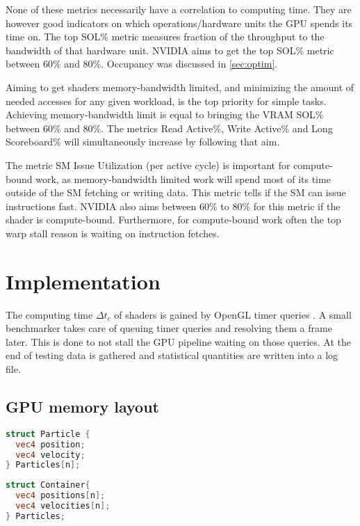 \documentclass[m,times]{cgMA}
\begin{document}
None of these metrics necessarily have a correlation to computing time. They are however good indicators on which operations/hardware units the GPU spends its time on. The top SOL\% metric measures fraction of the throughput to the bandwidth of that hardware unit. NVIDIA aims to get the top SOL\% metric between 60\% and 80\%. Occupancy was discussed in \ref{sec:optim}. \cite{NVIDIA:PEAK_PERFORMANCE}

Aiming to get shaders memory-bandwidth limited, and minimizing the amount of needed accesses for any given workload, is the top priority for simple tasks. Achieving memory-bandwidth limit is equal to bringing the VRAM SOL\% between 60\% and 80\%. The metrics Read Active\%, Write Active\% and Long Scoreboard\% will simultaneously increase by following that aim.

The metric SM Issue Utilization (per active cycle) is important for compute-bound work, as memory-bandwidth limited work will spend most of its time outside of the SM fetching or writing data. This metric tells if the SM can issue instructions fast. NVIDIA also aims between 60\% to 80\% for this metric if the shader is compute-bound. Furthermore, for compute-bound work often the top warp stall reason is waiting on instruction fetches.

\clearpage
\section{Implementation}\label{sec:implementation}
The computing time $\Delta t_c$ of shaders is gained by OpenGL timer queries \cite{KHRONOS:TIMER_QUERY}. A small benchmarker takes care of queuing timer queries and resolving them a frame later. This is done to not stall the GPU pipeline waiting on those queries. At the end of testing data is gathered and statistical quantities are written into a log file.
\subsection{GPU memory layout}\label{sec:soa_aos}
\noindent\begin{minipage}{0.45\textwidth}
\begin{lstlisting}[caption={AoS Layout},language={GLSL},style={GL}]
struct Particle {
  vec4 position;
  vec4 velocity;
} Particles[n];
\end{lstlisting}
\end{minipage}
\hfill\noindent\begin{minipage}{0.45\textwidth}
\begin{lstlisting}[caption={SoA Layout},label={llst:soa},language={GLSL},style={GL}]
struct Container{
  vec4 positions[n];
  vec4 velocities[n];
} Particles;
\end{lstlisting}
\end{minipage}
\end{document}
